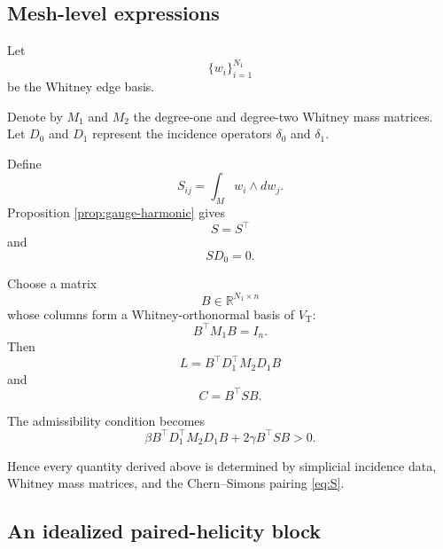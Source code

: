 \documentclass[11pt]{article}
\theoremstyle{definition}
\theoremstyle{remark}
\newcommand{\R}{\mathbb{R}}
\begin{document}
\subsection{Mesh-level expressions}

Let
\begin{equation}
\{w_i\}_{i=1}^{N_1}
\end{equation}
be the Whitney edge basis.

Denote by \(M_1\) and \(M_2\) the degree-one and degree-two
Whitney mass matrices. Let \(D_0\) and \(D_1\) represent the
incidence operators \(\delta_0\) and \(\delta_1\).

Define
\begin{equation}
S_{ij}
=
\int_M
w_i\wedge dw_j.
\label{eq:S}
\end{equation}
Proposition \ref{prop:gauge-harmonic} gives
\begin{equation}
S=S^\top
\label{eq:S-symmetric}
\end{equation}
and
\begin{equation}
SD_0=0.
\label{eq:S-gauge}
\end{equation}

Choose a matrix
\begin{equation}
B\in\R^{N_1\times n}
\end{equation}
whose columns form a Whitney-orthonormal basis of
\(V_{\mathrm T}\):
\begin{equation}
B^\top M_1B=I_n.
\label{eq:B}
\end{equation}
Then
\begin{equation}
L
=
B^\top D_1^\top M_2D_1B
\label{eq:L}
\end{equation}
and
\begin{equation}
C
=
B^\top SB.
\label{eq:C}
\end{equation}

The admissibility condition becomes
\begin{equation}
\beta B^\top D_1^\top M_2D_1B
+
2\gamma B^\top SB
>
0.
\label{eq:mesh-admissibility}
\end{equation}

Hence every quantity derived above is determined by
simplicial incidence data, Whitney mass matrices, and the
Chern--Simons pairing \eqref{eq:S}.

\subsection{An idealized paired-helicity block}
\end{document}
